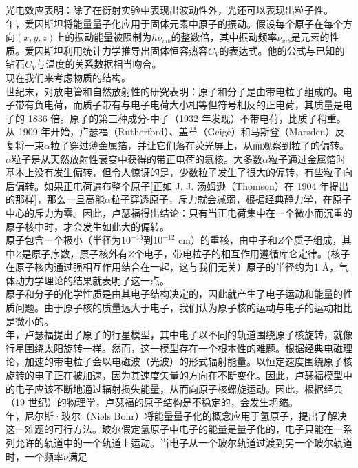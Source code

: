 \documentclass{book}
\begin{document}
	\indent 光电效应表明：除了在衍射实验中表现出波动性外，光还可以表现出粒子性。\\
	 年，爱因斯坦将能量量子化应用于固体元素中原子的振动。假设每个原子在每个方向$\left(x,y,z\right)$上的振动能量被限制为$h\nu_{vib}$的整数倍，其中振动频率$\nu_{vib}$是元素的性质。爱因斯坦利用统计力学推导出固体恒容热容$C_V$的表达式。他的公式与已知的钻石$C_V$与温度的关系数据相当吻合。\\
	\indent 现在我们来考虑物质的结构。\\
	 世纪末，对放电管和自然放射性的研究表明：原子和分子是由带电粒子组成的。电子带有负电荷，而质子带有与电子电荷大小相等但符号相反的正电荷，其质量是电子的 1836 倍。原子的第三种成分-中子（1932 年发现）不带电荷，比质子稍重。\\
	\indent 从 1909 年开始，卢瑟福（Rutherford）、盖革（Geige）和马斯登（Marsden）反复将一束$\alpha$粒子穿过薄金属箔，并让它们落在荧光屏上，从而观察到粒子的偏转。$\alpha$粒子是从天然放射性衰变中获得的带正电荷的氦核。大多数$\alpha$粒子通过金属箔时基本上没有发生偏转，但令人惊讶的是，少数粒子发生了很大的偏转，有些粒子向后偏转。如果正电荷遍布整个原子[正如 J. J. 汤姆逊（Thomson）在 1904 年提出的那样]，那么一旦高能$\alpha$粒子穿透原子，斥力就会减弱，根据经典静力学，在原子中心的斥力为零。因此，卢瑟福得出结论：只有当正电荷集中在一个微小而沉重的原子核中时，才会发生如此大的偏转。\\
	\indent 原子包含一个极小（半径为$10^{-13}$到$10^{-12}$ cm）的重核，由中子和$Z$个质子组成，其中$Z$是原子序数，原子核外有$Z$个电子，带电粒子的相互作用遵循库仑定律。(核子在原子核内通过强相互作用结合在一起，这与我们无关）原子的半径约为1 \AA，气体动力学理论的结果就表明了这一点。\\
	\indent 原子和分子的化学性质是由其电子结构决定的，因此就产生了电子运动和能量的性质问题。由于原子核的质量远大于电子，我们认为原子核的运动与电子的运动相比是微小的。\\
	 年，卢瑟福提出了原子的行星模型，其中电子以不同的轨道围绕原子核旋转，就像行星围绕太阳旋转一样。然而，这一模型存在一个根本性的难题。根据经典电磁理论，加速的带电粒子会以电磁波（光波）的形式辐射能量。以恒定速度围绕原子核旋转的电子正在被加速，因为其速度矢量的方向在不断变化。因此，卢瑟福模型中的电子应该不断地通过辐射损失能量，从而向原子核螺旋运动。因此，根据经典（19 世纪）的物理学，卢瑟福的原子结构是不稳定的，会发生坍缩。\\
	 年，尼尔斯·玻尔（Niels Bohr）将能量量子化的概念应用于氢原子，提出了解决这一难题的可行方法。玻尔假定氢原子中电子的能量是量子化的，电子只能在一系列允许的轨道中的一个轨道上运动。当电子从一个玻尔轨道过渡到另一个玻尔轨道时，一个频率$\nu$满足
\end{document}
